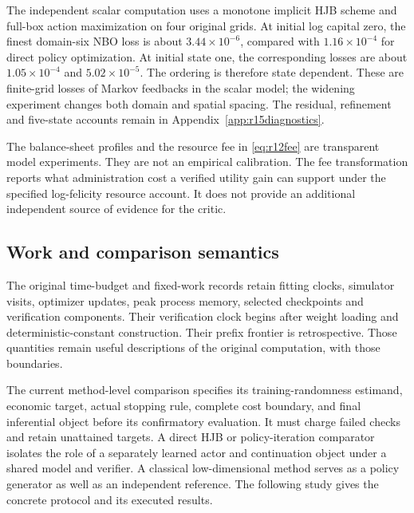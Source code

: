 The independent scalar computation uses a monotone implicit HJB scheme and full-box action maximization on four original grids. At initial log capital zero, the finest domain-six NBO loss is about $3.44\times10^{-6}$, compared with $1.16\times10^{-4}$ for direct policy optimization. At initial state one, the corresponding losses are about $1.05\times10^{-4}$ and $5.02\times10^{-5}$. The ordering is therefore state dependent. These are finite-grid losses of Markov feedbacks in the scalar model; the widening experiment changes both domain and spatial spacing. The residual, refinement and five-state accounts remain in Appendix~\ref{app:r15diagnostics}.

The balance-sheet profiles and the resource fee in \eqref{eq:r12fee} are transparent model experiments. They are not an empirical calibration. The fee transformation reports what administration cost a verified utility gain can support under the specified log-felicity resource account. It does not provide an additional independent source of evidence for the critic.

\subsection{Work and comparison semantics}\label{sec:r15work}
The original time-budget and fixed-work records retain fitting clocks, simulator visits, optimizer updates, peak process memory, selected checkpoints and verification components. Their verification clock begins after weight loading and deterministic-constant construction. Their prefix frontier is retrospective. Those quantities remain useful descriptions of the original computation, with those boundaries.

The current method-level comparison specifies its training-randomness estimand, economic target, actual stopping rule, complete cost boundary, and final inferential object before its confirmatory evaluation. It must charge failed checks and retain unattained targets. A direct HJB or policy-iteration comparator isolates the role of a separately learned actor and continuation object under a shared model and verifier. A classical low-dimensional method serves as a policy generator as well as an independent reference. The following study gives the concrete protocol and its executed results.
